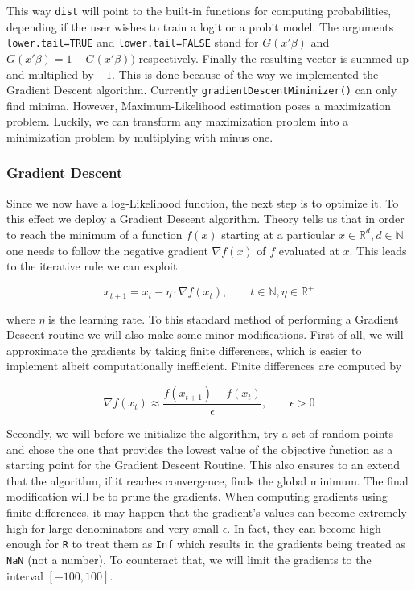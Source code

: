 \documentclass{article}
\begin{document}


This way \texttt{dist} will point to the built-in functions for computing probabilities, depending if the user wishes to train a logit or a probit model. The arguments \texttt{lower.tail=TRUE} and \texttt{lower.tail=FALSE} stand for $G(x\prime \beta)$ and $G(x\prime \beta)= 1 - G(x\prime \beta))$ respectively. Finally the resulting vector is summed up and multiplied by $-1$. This is done because of the way we implemented the Gradient Descent algorithm. Currently \texttt{gradientDescentMinimizer()} can only find minima. However, Maximum-Likelihood estimation poses a maximization problem. Luckily, we can transform any maximization problem into a minimization problem by multiplying with minus one.

\subsubsection{Gradient Descent}

Since we now have a log-Likelihood function, the next step is to optimize it. To this effect we deploy a Gradient Descent algorithm. Theory tells us that in order to reach the minimum of a function $f(x)$ starting at a particular $x \in \mathbb{R}^d, d \in \mathbb{N}$ one needs to follow the negative gradient $\nabla f(x)$ of $f$ evaluated at $x$. This leads to the iterative rule we can exploit

\begin{equation}
\label{gradientDescent}
x_{t+1} = x_t - \eta \cdot \nabla f(x_t), \qquad t \in \mathbb{N}, \eta \in \mathbb{R}^+
\end{equation}

where $\eta$ is the learning rate. To this standard method of performing a Gradient Descent routine we will also make some minor modifications. First of all, we will approximate the gradients by taking finite differences, which is easier to implement albeit computationally inefficient. Finite differences are computed by

\begin{equation}
\label{finDiff}
\nabla f(x_t) \approx \frac{f(x_{t+1}) - f(x_t)}{\epsilon}, \qquad \epsilon > 0
\end{equation}

Secondly, we will before we initialize the algorithm, try a set of random points and chose the one that provides the lowest value of the objective function as a starting point for the Gradient Descent Routine. This also ensures to an extend that the algorithm, if it reaches convergence, finds the global minimum. The final modification will be to prune the gradients. When computing gradients using finite differences, it may happen that the gradient's values can become extremely high for large denominators and very small $\epsilon$. In fact, they can become high enough for \texttt{R} to treat them as \texttt{Inf} which results in the gradients being treated as \texttt{NaN} (not a number). To counteract that, we will limit the gradients to the interval $[-100, 100]$. 
\end{document}
